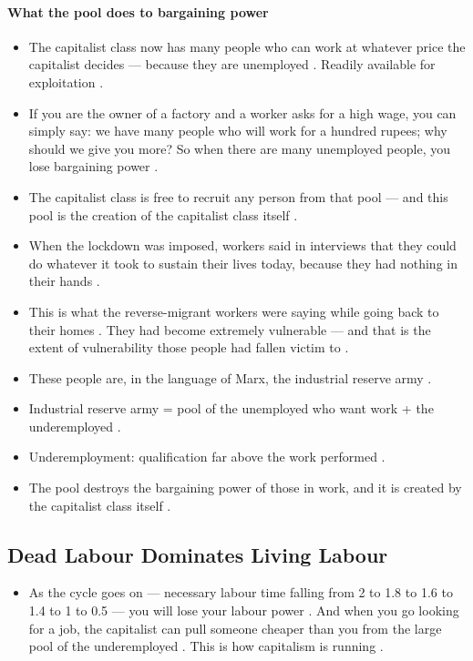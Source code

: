 \paragraph{What the pool does to bargaining power}
\begin{itemize}
    \item The capitalist class now has many people who can work at whatever price the capitalist decides --- because they are unemployed . Readily available for exploitation .
    \item If you are the owner of a factory and a worker asks for a high wage, you can simply say: we have many people who will work for a hundred rupees; why should we give you more? So when there are many unemployed people, you lose bargaining power .
    \item The capitalist class is free to recruit any person from that pool --- and this pool is the creation of the capitalist class itself .
\end{itemize}

\begin{ExampleBox}
\begin{itemize}
    \item When the lockdown was imposed, workers said in interviews that they could do whatever it took to sustain their lives today, because they had nothing in their hands .
    \item This is what the reverse-migrant workers were saying while going back to their homes . They had become extremely vulnerable --- and that is the extent of vulnerability those people had fallen victim to .
    \item These people are, in the language of Marx, the industrial reserve army .
\end{itemize}
\end{ExampleBox}

\begin{QuickRevision}
\begin{itemize}
    \item Industrial reserve army = pool of the unemployed who want work + the underemployed .
    \item Underemployment: qualification far above the work performed .
    \item The pool destroys the bargaining power of those in work, and it is created by the capitalist class itself .
\end{itemize}
\end{QuickRevision}

\subsection{Dead Labour Dominates Living Labour}
\begin{itemize}
    \item As the cycle goes on --- necessary labour time falling from 2 to 1.8 to 1.6 to 1.4 to 1 to 0.5 --- you will lose your labour power . And when you go looking for a job, the capitalist can pull someone cheaper than you from the large pool of the underemployed . This is how capitalism is running .
\end{itemize}

